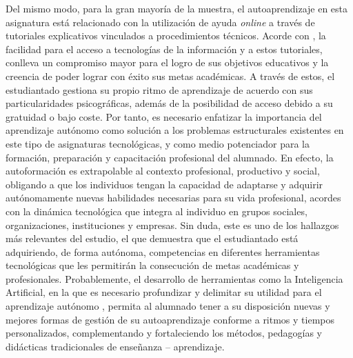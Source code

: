\documentclass[spanish]{textolivre}
\begin{document}
Del mismo modo, para la gran mayoría de la muestra, el autoaprendizaje en esta asignatura está relacionado con la utilización de ayuda \textit{online} a través de tutoriales explicativos vinculados a procedimientos técnicos. Acorde con \textcite{padilla_aprendizaje_2020}, la facilidad para el acceso a tecnologías de la información y a estos tutoriales, conlleva un compromiso mayor para el logro de sus objetivos educativos y la creencia de poder lograr con éxito sus metas académicas. A través de estos, el estudiantado gestiona su propio ritmo de aprendizaje de acuerdo con sus particularidades psicográficas, además de la posibilidad de acceso debido a su gratuidad o bajo coste. Por tanto, es necesario enfatizar la importancia del aprendizaje autónomo como solución a los problemas estructurales existentes en este tipo de asignaturas tecnológicas, y como medio potenciador para la formación, preparación y capacitación profesional del alumnado. En efecto, la autoformación es extrapolable al contexto profesional, productivo y social, obligando a que los individuos tengan la capacidad de adaptarse y adquirir autónomamente nuevas habilidades necesarias para su vida profesional, acordes con la dinámica tecnológica que integra al individuo en grupos sociales, organizaciones, instituciones y empresas. Sin duda, este es uno de los hallazgos más relevantes del estudio, el que demuestra que el estudiantado está adquiriendo, de forma autónoma, competencias en diferentes herramientas tecnológicas que les permitirán la consecución de metas académicas y profesionales. Probablemente, el desarrollo de herramientas como la Inteligencia Artificial, en la que es necesario profundizar y delimitar su utilidad para el aprendizaje autónomo \cite{artiles_rodriguez_agente_2021}, permita al alumnado tener a su disposición nuevas y mejores formas de gestión de su autoaprendizaje conforme a ritmos y tiempos personalizados, complementando y fortaleciendo los métodos, pedagogías y didácticas tradicionales de enseñanza – aprendizaje.
\end{document}
